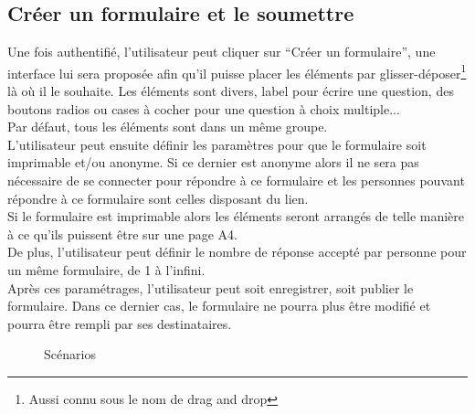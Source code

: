 \documentclass{sigplanconf}
\begin{document}
\subsection{Créer un formulaire et le soumettre}
Une fois authentifié, l'utilisateur peut cliquer sur “Créer un formulaire”, une interface lui sera proposée afin qu’il puisse placer les éléments par glisser-déposer\footnote{Aussi connu sous le nom de drag and drop} là où il le souhaite. Les éléments sont divers, label pour écrire une question, des boutons radios ou cases à cocher pour une question à choix multiple...\\
Par défaut, tous les éléments sont dans un même groupe.\\
L’utilisateur peut ensuite définir les paramètres pour que le formulaire soit imprimable et/ou anonyme. Si ce dernier est anonyme alors il ne sera pas nécessaire de se connecter pour répondre à ce formulaire et les personnes pouvant répondre à ce formulaire sont celles disposant du lien.\\
Si le formulaire est imprimable alors les éléments seront arrangés de telle manière à ce qu’ils puissent être sur une page A4.\\
De plus, l’utilisateur peut définir le nombre de réponse accepté par personne pour un même formulaire, de 1 à l’infini.\\
Après ces paramétrages, l’utilisateur peut soit enregistrer, soit publier le formulaire. Dans ce dernier cas, le formulaire ne pourra plus être modifié et pourra être rempli par ses destinataires.\\

\begin{figure} %
\begin{center}
\end{center}
\caption{Scénarios}
\label{scenarios}
\end{figure}
\end{document}
